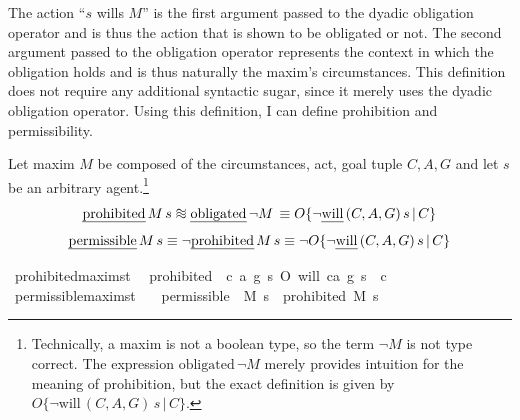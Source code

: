 \begin{isabellebody}
\begin{isamarkuptext}
The action ``$s$ wills $M$'' is the first argument passed to the dyadic obligation operator and is 
thus the action that is shown to be obligated or not. The second argument passed to the obligation 
operator represents the context in which the obligation holds and is thus naturally the maxim's circumstances.
This definition does not require any additional syntactic sugar, since it merely uses the dyadic obligation
operator. Using this definition, I can define prohibition and permissibility.

\begin{definition} Let maxim $M$ be composed of the circumstances, act, 
goal tuple $C, A, G$ and let $s$ be an arbitrary agent.\footnote{Technically, a maxim is not a boolean 
type, so the term $\neg M$ is not type correct. The expression $\text{obligated} \, \neg M$ merely provides 
intuition for the meaning of prohibition, but the exact definition is given by 
$O\{ \neg \text{will} \, (C, A, G) \, s \, | \, C\}$.}
\newcommand*{\approxident}{%
  \mathrel{\vcenter{\offinterlineskip
  \hbox{$\sim$}\vskip-.35ex\hbox{$\sim$}\vskip-.35ex\hbox{$\sim$}}}}
$$\text{\emph{prohibited}} \, M \, s \approxident \text{\emph{obligated}} \, \neg M \, \equiv O\{ \neg \text{\emph{will}} \, (C, A, G) \, s \, | \, C\}$$
$$\text{\emph{permissible}} \, M \, s \equiv \neg \text{\emph{prohibited}} \, M \, s \equiv \neg O\{ \neg \text{\emph{will}} \, (C, A, G) \, s \, | \, C\}$$
\end{definition}%
\end{isamarkuptext}\isamarkuptrue%
\isamarkupfalse%
\ prohibited{\isacharcolon}{\isacharcolon}{\isachardoublequoteopen}maxim{\isasymRightarrow}s{\isasymRightarrow}t{\isachardoublequoteclose}\ \ \isanewline
{\isachardoublequoteopen}prohibited\ {\isasymequiv}\ {\isasymlambda}{\isacharparenleft}c{\isacharcomma}\ a{\isacharcomma}\ g{\isacharparenright}\ s{\isachardot}\ O{\isacharbraceleft}\isactrlbold {\isasymnot}\ {\isacharparenleft}will\ {\isacharparenleft}c{\isacharcomma}a{\isacharcomma}\ g{\isacharparenright}\ s{\isacharparenright}\ {\isacharbar}\ c{\isacharbraceright}{\isachardoublequoteclose}\isanewline
%
\isanewline
{}\isamarkupfalse%
\ permissible{\isacharcolon}{\isacharcolon}{\isachardoublequoteopen}maxim{\isasymRightarrow}s{\isasymRightarrow}t{\isachardoublequoteclose}\isanewline
\ \ \ {\isachardoublequoteopen}permissible\ {\isasymequiv}\ {\isasymlambda}M\ s{\isachardot}\ \isactrlbold {\isasymnot}\ {\isacharparenleft}prohibited\ M\ s{\isacharparenright}{\isachardoublequoteclose}\isanewline

\end{isabellebody}
